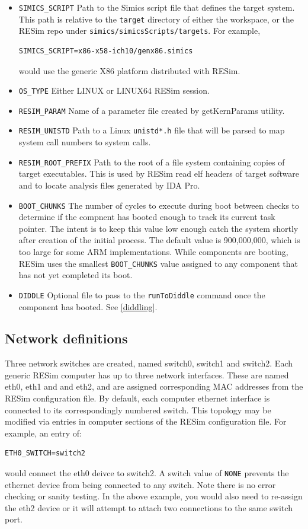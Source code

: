 \documentclass[titlepage]{article}
\begin{document}
\begin{itemize}
\item {\tt SIMICS\_SCRIPT} Path to the Simics script file that defines the target system.  This path is relative to the {\tt target} directory
of either the workspace, or the RESim repo under {\tt simics/simicsScripts/targets}.  For example, 
\begin{verbatim}
SIMICS_SCRIPT=x86-x58-ich10/genx86.simics
\end{verbatim}
\noindent would use the generic X86 platform distributed with RESim.
\item {\tt OS\_TYPE} Either LINUX or LINUX64
RESim session.
\item {\tt RESIM\_PARAM} Name of a parameter file created by getKernParams utility.
\item {\tt RESIM\_UNISTD} Path to a Linux {\tt unistd*.h} file that will be parsed to map system call numbers to system calls.
\item {\tt RESIM\_ROOT\_PREFIX} Path to the root of a file system containing copies of target executables.  This is used by RESim read elf
headers of target software and to locate analysis files generated by IDA Pro. 
\item {\tt BOOT\_CHUNKS} The number of cycles to execute during boot between checks to determine if the compnent has booted enough to track
its current task pointer.  The intent is to keep this value low enough catch the system shortly after creation of the initial process.
The default value is 900,000,000, which is too large for some ARM implementations.  While components are booting, RESim uses the smallest
{\tt BOOT\_CHUNKS} value assigned to any component that has not yet completed its boot.
\item {\tt DIDDLE} Optional file to pass to the {\tt runToDiddle} command once the component has booted.  See \ref{diddling}.
\end{itemize}

\subsection{Network definitions}
\label{networks}
Three network switches are created, named switch0, switch1 and switch2.   Each generic RESim computer has up to three network interfaces.
These are named eth0, eth1 and and eth2, and are assigned corresponding MAC addresses from the
RESim configuration file. By default, each computer ethernet interface is connected to its correspondingly numbered switch.
This topology may be modified via entries in computer sections of the RESim configuration file.  For example, an entry of:
\begin{verbatim}
ETH0_SWITCH=switch2
\end{verbatim}
\noindent would connect the eth0 deivce to switch2.  A switch value of {\tt NONE} prevents the ethernet device from being connected
to any switch.  Note there is no error checking or sanity testing.  In the above example, you would also need to re-assign the eth2 device
or it will attempt to attach two connections to the same switch port.
\end{document}
